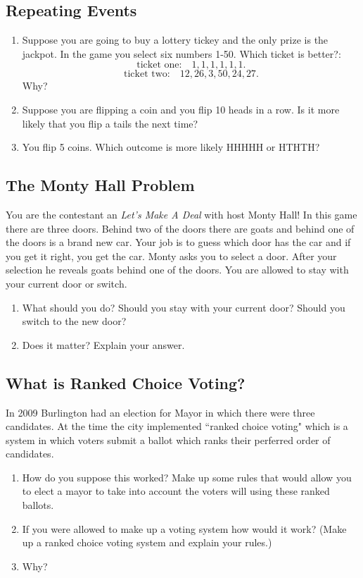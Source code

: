 \documentclass[]{article}
\numberwithin{equation}{section}
\theoremstyle{definition}
\theoremstyle{remark}
\begin{document}
\subsection{Repeating Events}
\begin{enumerate}
	\item Suppose you are going to buy a lottery tickey and the only prize is the jackpot. In the game you select six numbers 1-50. Which ticket is better?: 
	$$\mbox{ticket one:} \quad  1,1,1,1,1,1. $$
	$$\mbox{ticket two:} \quad 12,26,3,50,24,27.$$
	Why?
\item Suppose you are flipping a coin and you flip 10 heads in a row. Is it more likely that you flip a tails the next time?
\item You flip 5 coins. Which outcome is more likely HHHHH or HTHTH?
\end{enumerate}

\subsection{The Monty Hall Problem } 
You are the contestant an \emph{Let's Make A Deal} with host Monty Hall! In this game there are three doors. Behind two of the doors there are goats and behind one of the doors is a brand new car. Your job is to guess which door has the car and if you get it right, you get the car. Monty asks you to select a door. After your selection he reveals goats behind one of the doors. You are allowed to stay with your current door or switch. 
\begin{enumerate}
\item What should you do? Should you stay with your current door? Should you switch to the new door? 
\item Does it matter? Explain your answer.
\end{enumerate}

\subsection{What is Ranked Choice Voting? }
In 2009 Burlington had an election for Mayor in which there were three candidates. At the time the city implemented ``ranked choice voting" which is a system in which voters submit a ballot which ranks their perferred order of candidates. 

\begin{enumerate}
	\item How do you suppose this worked? Make up some rules that would allow you to elect a mayor to take into account the voters will using these ranked ballots. 
	\item If you were allowed to make up a voting system how would it work? (Make up a ranked choice voting system and explain your rules.) 
	\item Why?
\end{enumerate}
	
\end{document}
